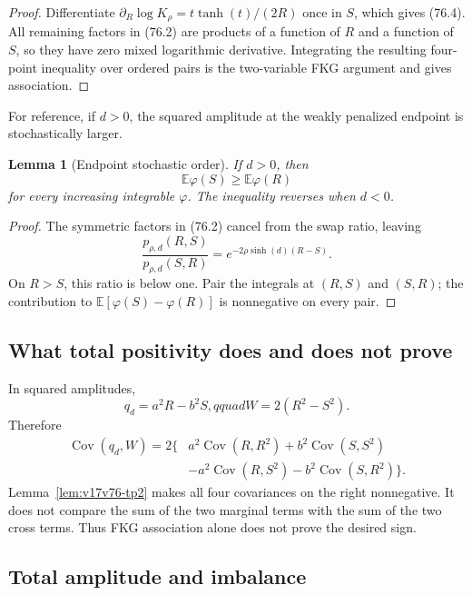 \documentclass[11pt]{article}
\newtheorem{lemma}[theorem]{Lemma}
\theoremstyle{remark}
\begin{document}
\begin{proof}
Differentiate
\(\partial_R\log K_\rho=t\tanh(t)/(2R)\) once in \(S\), which gives
(76.4).  All remaining factors in (76.2) are products of a function
of \(R\) and a function of \(S\), so they have zero mixed logarithmic
derivative.  Integrating the resulting four-point inequality over
ordered pairs is the two-variable FKG argument and gives association.
\end{proof}

For reference, if \(d>0\), the squared amplitude at the weakly
penalized endpoint is stochastically larger.

\begin{lemma}[Endpoint stochastic order]
\label{lem:v17v76-order}
If \(d>0\), then
\[
 \mathbb E\varphi(S)\geq\mathbb E\varphi(R)       \tag{76.5}
\]
for every increasing integrable \(\varphi\).  The inequality reverses
when \(d<0\).
\end{lemma}

\begin{proof}
The symmetric factors in (76.2) cancel from the swap ratio, leaving
\[
 \frac{p_{\rho,d}(R,S)}{p_{\rho,d}(S,R)}
 =e^{-2\rho\sinh(d)(R-S)}.                        \tag{76.6}
\]
On \(R>S\), this ratio is below one.  Pair the integrals at
\((R,S)\) and \((S,R)\); the contribution to
\(\mathbb E[\varphi(S)-\varphi(R)]\) is nonnegative on every pair.
\end{proof}

\subsection{What total positivity does and does not prove}

In squared amplitudes,
\[
 q_d=a^2R-b^2S,qquad W=2(R^2-S^2).                \tag{76.7}
\]
Therefore
\[
\begin{aligned}
 \operatorname{Cov}(q_d,W)
 =2\{&a^2\operatorname{Cov}(R,R^2)
      +b^2\operatorname{Cov}(S,S^2)\\
     &-a^2\operatorname{Cov}(R,S^2)
      -b^2\operatorname{Cov}(S,R^2)\}.            \tag{76.8}
\end{aligned}
\]
Lemma~\ref{lem:v17v76-tp2} makes all four covariances on the right
nonnegative.  It does not compare the sum of the two marginal terms
with the sum of the two cross terms.  Thus FKG association alone does
not prove the desired sign.

\subsection{Total amplitude and imbalance}
\end{document}
